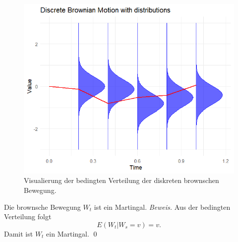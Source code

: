 \begin{bem}
\begin{figure}[H]
\begin{minipage}{0.48\textwidth}
    \includegraphics[width=\textwidth]{images/bb_with_cov.png}
    \caption{Visualierung der bedingten Verteilung der diskreten brownschen Bewegung.}
    \label{fig:bb_with_cov}
  \end{minipage}
\end{figure}
\end{bem}

\begin{korr}
Die brownsche Bewegung $W_t$ ist ein Martingal.
\textit{Beweis.} Aus der bedingten Verteilung folgt
$$
E(W_t | W_s = v) = v.
$$
Damit ist $W_t$ ein Martingal. \qed
\end{korr}  

